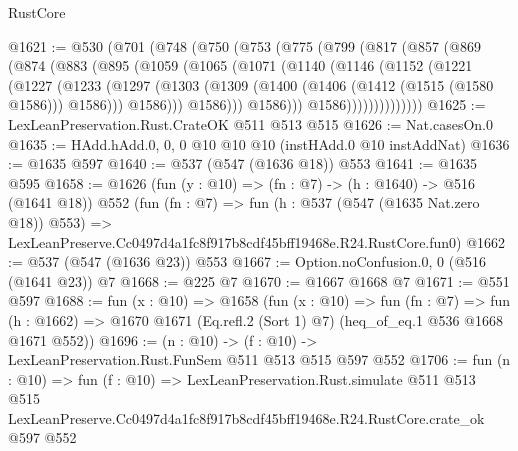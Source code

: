 \begin{lexlean}{RustCore}
\begin{coremodule}
@1621 := @530
    (@701
      (@748
        (@750
          (@753
            (@775
              (@799
                (@817
                  (@857
                    (@869
                      (@874
                        (@883
                          (@895
                            (@1059
                              (@1065
                                (@1071
                                  (@1140
                                    (@1146
                                      (@1152
                                        (@1221
                                          (@1227
                                            (@1233
                                              (@1297
                                                (@1303
                                                  (@1309
                                                    (@1400
                                                      (@1406 (@1412 (@1515 (@1580 @1586))) @1586)))
                                                  @1586)))
                                            @1586)))
                                      @1586)))
                                @1586))))))))))))))
@1625 := LexLeanPreservation.Rust.CrateOK @511 @513 @515
@1626 := Nat.casesOn.{0}
@1635 := HAdd.hAdd.{0, 0, 0} @10 @10 @10 (instHAdd.{0} @10 instAddNat)
@1636 := @1635 @597
@1640 := @537 (@547 (@1636 @18)) @553
@1641 := @1635 @595
@1658 := @1626
    (fun (y : @10) => (fn : @7) -> (h : @1640) -> @516 (@1641 @18))
    @552
    (fun (fn : @7) =>
    fun (h : @537 (@547 (@1635 Nat.zero @18)) @553) =>
    LexLeanPreserve.Cc0497d4a1fc8f917b8cdf45bff19468e.R24.RustCore.fun0)
@1662 := @537 (@547 (@1636 @23)) @553
@1667 := Option.noConfusion.{0, 0} (@516 (@1641 @23)) @7
@1668 := @225 @7
@1670 := @1667 @1668 @7
@1671 := @551 @597
@1688 := fun (x : @10) =>
  @1658
    (fun (x : @10) =>
    fun (fn : @7) =>
    fun (h : @1662) => @1670 @1671 (Eq.refl.{2} (Sort 1) @7) (heq_of_eq.{1} @536 @1668 @1671 @552))
@1696 := (n : @10) -> (f : @10) -> LexLeanPreservation.Rust.FunSem @511 @513 @515 @597 @552
@1706 := fun (n : @10) =>
  fun (f : @10) =>
  LexLeanPreservation.Rust.simulate
    @511
    @513
    @515
    LexLeanPreserve.Cc0497d4a1fc8f917b8cdf45bff19468e.R24.RustCore.crate_ok
    @597
    @552
\end{coremodule}
\end{lexlean}
